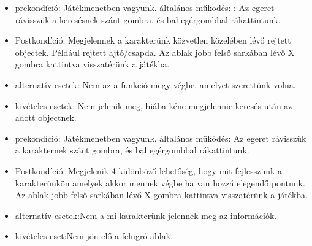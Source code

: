 
\begin{itemize}
    \item prekondíció: Játékmenetben vagyunk.
    általános működés: : Az egeret rávisszük a keresésnek szánt gombra, és bal egérgombbal rákattintunk.
    \item Postkondíció: Megjelennek a karakterünk közvetlen közelében lévő rejtett objectek. Például rejtett ajtó/csapda. Az ablak jobb felső sarkában lévő X gombra kattintva visszatérünk a játékba.
    \item alternatív esetek: Nem az a funkció megy végbe, amelyet szerettünk volna.
    \item kivételes esetek: Nem jelenik meg, hiába kéne megjelennie keresés után az adott objectnek.
\end{itemize}


\begin{itemize}
    \item prekondíció: Játékmenetben vagyunk.
    általános működés: Az egeret rávisszük a karakternek szánt gombra, és bal egérgombbal rákattintunk.
    \item Postkondíció: Megjelenik 4 különböző lehetőség, hogy mit fejlesszünk a karakterünkön amelyek akkor mennek végbe ha van hozzá elegendő pontunk. Az ablak jobb felső sarkában lévő X gombra kattintva visszatérünk a játékba.
    \item alternatív esetek:Nem a mi karakterünk jelennek meg az információk.
    \item kivételes eset:Nem jön elő a felugró ablak.
\end{itemize}

